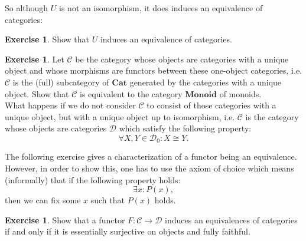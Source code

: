 \documentclass[a4paper,10pt]{scrartcl}
\newcommand{\onlydraft}[1]{} %
\renewcommand{\onlydraft}[1]{#1}  %
\theoremstyle{plain}
\theoremstyle{definition}
\newtheorem{exer}[thm]{Exercise}
\newcommand{\Cat}[1]{\mathcal{#1}}
\newcommand{\CC}{\Cat{C}}
\newcommand{\DD}{\Cat{D}}
\newcommand{\Catb}[1]{\mathbf{#1}}
\newcommand{\CAT}{\Catb{Cat}}
\newcommand{\MON}{\Catb{Monoid}}
\newcommand{\Ob}[1]{{#1}_0}
\begin{document}
So although $U$ is not an isomorphism, it does induces an equivalence of categories:
\begin{exer} Show that $U$ induces an equivalence of categories.
\end{exer}

\begin{exer} Let $\CC$ be the category whose objects are categories with a unique object and whose morphisms are functors between these one-object categories, i.e. $\CC$ is the (full) subcategory of $\CAT$ generated by the categories with a unique object. Show that $\CC$ is equivalent to the category $\MON$ of monoids. \\
What happens if we do not consider $\CC$ to consist of those categories with a unique object, but with a unique object up to isomorphism, i.e. $\CC$ is the category whose objects are categories $\DD$ which satisfy the following property: 
\[
\forall X,Y \in \Ob{\DD}: X\cong Y.
\]
\end{exer}

The following exercise gives a characterization of a functor being an equivalence. However, in order to show this, one has to use the axiom of choice which means (informally) that if the following property holds:
\[ 
\exists x: P(x),
\]
then we can fix some $x$ such that $P(x)$ holds.
\begin{exer} Show that a functor $F:\CC\to\DD$ induces an equivalences of categories if and only if it is essentially surjective on objects and fully faithful.
\end{exer}


\onlydraft{}

\onlydraft{}

\onlydraft{}





\printbibliography
\end{document}
